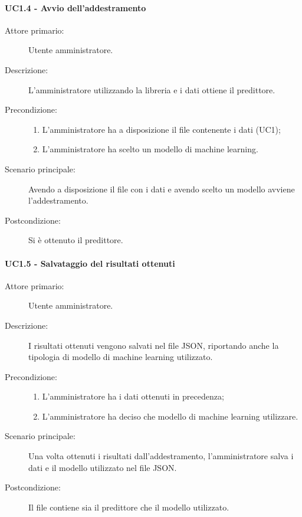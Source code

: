 \paragraph{UC1.4 - Avvio dell'addestramento}
\label{sssec:uc1.4}
\begin{description}
  \item[Attore primario:] Utente amministratore.
  \item[Descrizione:] L'amministratore utilizzando la libreria e i dati ottiene il predittore.
  \item[Precondizione:]
  \begin{enumerate}
    \item L'amministratore ha a disposizione il file contenente i dati (UC1);
    \item L'amministratore ha scelto un modello di machine learning.
  \end{enumerate}
  \item[Scenario principale:] Avendo a disposizione il file con i dati e avendo scelto un modello avviene l'addestramento.
  \item[Postcondizione:] Si è ottenuto il predittore.
\end{description}

\paragraph{UC1.5 - Salvataggio del risultati ottenuti}
\label{sssec:uc1.5}
\begin{description}
  \item[Attore primario:] Utente amministratore.
  \item[Descrizione:] I risultati ottenuti vengono salvati nel file JSON, riportando anche la tipologia di modello di machine learning utilizzato.
  \item[Precondizione:]
  \begin{enumerate}
    \item L'amministratore ha i dati ottenuti in precedenza;
    \item L'amministratore ha deciso che modello di machine learning  utilizzare.
  \end{enumerate}
  \item[Scenario principale:] Una volta ottenuti i risultati dall'addestramento, l'amministratore salva i dati e il modello utilizzato nel file JSON.
  \item[Postcondizione:] Il file contiene sia il predittore che il modello utilizzato.
\end{description}
